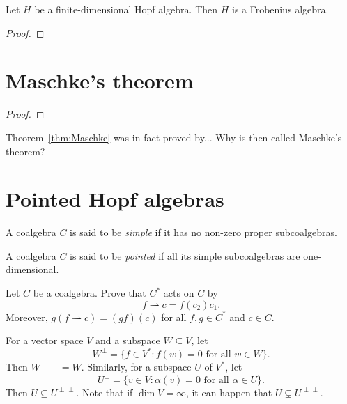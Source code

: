 \begin{proposition}
\end{proposition}

\begin{theorem}
  Let $H$ be a finite-dimensional Hopf algebra. Then $H$ is
  a Frobenius algebra. 
\end{theorem}

\begin{proof}
  
\end{proof} 

\section{Maschke's theorem}

\begin{theorem}
  \label{thm:Maschke}
\end{theorem}

\begin{proof}
\end{proof}

Theorem~\ref{thm:Maschke} was in fact proved by... Why is then called
Maschke's theorem? 

\section{Pointed Hopf algebras}

\begin{definition}
    A coalgebra $C$ is said to be \emph{simple} if it has no
    non-zero proper subcoalgebras. 
\end{definition}

\begin{definition}
    A coalgebra $C$ is said to be \emph{pointed} if all its 
    simple subcoalgebras are one-dimensional. 
\end{definition}

\begin{exercise}
\label{xca:Cdual_on_C}
    Let $C$ be a coalgebra. Prove that 
    $C^*$ acts on $C$ by
    \[
    f\rightharpoonup c=f(c_2)c_1.
    \]
    Moreover, $g(f\rightharpoonup c)=(gf)(c)$ for 
    all $f,g\in C^*$ and $c\in C$. 
\end{exercise}

For a vector space $V$ and a subspace $W\subseteq V$, let 
\[
W^\perp=\{f\in V^*:f(w)=0\text{ for all $w\in W$}\}.
\]
Then $W^{\perp\perp}=W$. 
Similarly, for a subspace $U$ of $V^*$, let 
\[
U^\perp=\{v\in V:\alpha(v)=0\text{ for all $\alpha\in U$}\}.
\]
Then $U\subseteq U^{\perp\perp}$. Note that
if $\dim V=\infty$, it can happen that $U\subsetneq U^{\perp\perp}$. 

